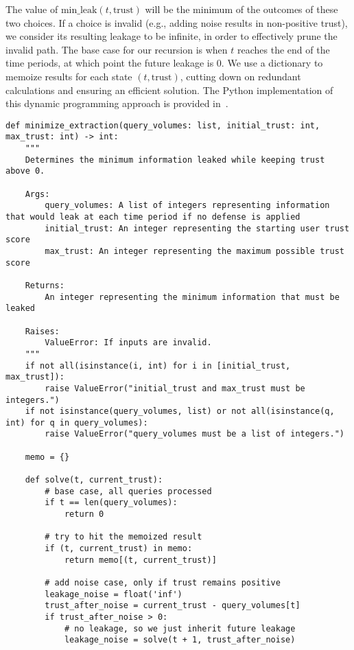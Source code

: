 \documentclass{solutionclass} %
\begin{document}
The value of $\text{min\_leak}(t, \text{trust})$ will be the minimum of the outcomes of these two choices. If a choice is invalid (e.g., adding noise results in non-positive trust), we consider its resulting leakage to be infinite, in order to effectively prune the invalid path. The base case for our recursion is when $t$ reaches the end of the time periods, at which point the future leakage is 0. We use a dictionary to memoize results for each state $(t, \text{trust})$, cutting down on redundant calculations and ensuring an efficient solution. The Python implementation of this dynamic programming approach is provided in~.

\clearpage

\begin{lstlisting}[style=pythonstyle, caption={Python implementation of the solution for Problem B.1: Defense Against Model Extraction}, label={lst:problem_b1_solution}]
def minimize_extraction(query_volumes: list, initial_trust: int, max_trust: int) -> int:
    """
    Determines the minimum information leaked while keeping trust above 0.
    
    Args:
        query_volumes: A list of integers representing information that would leak at each time period if no defense is applied
        initial_trust: An integer representing the starting user trust score
        max_trust: An integer representing the maximum possible trust score
        
    Returns:
        An integer representing the minimum information that must be leaked
        
    Raises:
        ValueError: If inputs are invalid.
    """
    if not all(isinstance(i, int) for i in [initial_trust, max_trust]):
        raise ValueError("initial_trust and max_trust must be integers.")
    if not isinstance(query_volumes, list) or not all(isinstance(q, int) for q in query_volumes):
        raise ValueError("query_volumes must be a list of integers.")

    memo = {}

    def solve(t, current_trust):
        # base case, all queries processed
        if t == len(query_volumes):
            return 0
        
        # try to hit the memoized result
        if (t, current_trust) in memo:
            return memo[(t, current_trust)]

        # add noise case, only if trust remains positive
        leakage_noise = float('inf')
        trust_after_noise = current_trust - query_volumes[t]
        if trust_after_noise > 0:
            # no leakage, so we just inherit future leakage
            leakage_noise = solve(t + 1, trust_after_noise)


\end{lstlisting}
\end{document}

